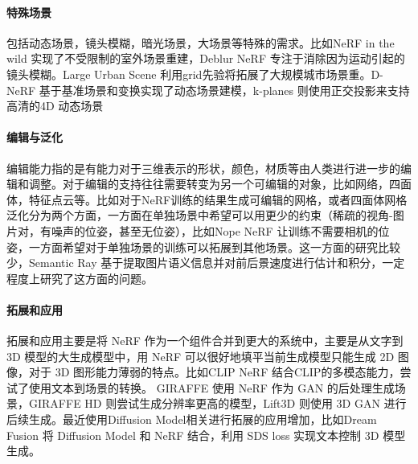 \paragraph{特殊场景}

包括动态场景，镜头模糊，暗光场景，大场景等特殊的需求。比如NeRF in the wild\cite{martin-bruallaNeRFWildNeural2021} 实现了不受限制的室外场景重建，Deblur NeRF \cite{leeDPNeRFDeblurredNeural2023} 专注于消除因为运动引起的镜头模糊。Large Urban Scene \cite{xuGridguidedNeuralRadiance2023} 利用grid先验将拓展了大规模城市场景重。D-NeRF \cite{pumarolaDNeRFNeuralRadiance2021} 基于基准场景和变换实现了动态场景建模，k-planes\cite{KPlanesExplicitRadiance2023} 则使用正交投影来支持高清的4D 动态场景

\paragraph{编辑与泛化}

编辑能力指的是有能力对于三维表示的形状，颜色，材质等由人类进行进一步的编辑和调整。对于编辑的支持往往需要转变为另一个可编辑的对象，比如网络，四面体，特征点云等。比如对于NeRF训练的结果生成可编辑的网格，或者四面体网格\cite{kulhanekTetraNeRFRepresentingNeural2023}
泛化分为两个方面，一方面在单独场景中希望可以用更少的约束（稀疏的视角-图片对，有噪声的位姿，甚至无位姿），比如Nope NeRF \cite{bianNoPeNeRFOptimisingNeural2023} 让训练不需要相机的位姿，一方面希望对于单独场景的训练可以拓展到其他场景。这一方面的研究比较少，Semantic Ray \cite{liuSemanticRayLearning2023} 基于提取图片语义信息并对前后景速度进行估计和积分，一定程度上研究了这方面的问题。

\paragraph{拓展和应用}

拓展和应用主要是将 NeRF 作为一个组件合并到更大的系统中，主要是从文字到 3D 模型的大生成模型中，用 NeRF 可以很好地填平当前生成模型只能生成 2D 图像，对于 3D 图形能力薄弱的特点。比如CLIP NeRF \cite{wangCLIPNeRFTextandImageDriven2022} 结合CLIP的多模态能力，尝试了使用文本到场景的转换。
GIRAFFE \cite{niemeyerGIRAFFERepresentingScenes2021} 使用 NeRF 作为 GAN 的后处理生成场景，GIRAFFE HD \cite{xueGIRAFFEHDHighResolution2022} 则尝试生成分辨率更高的模型，Lift3D \cite{liLift3DSynthesize3D2023} 则使用 3D GAN 进行后续生成。最近使用Diffusion Model相关进行拓展的应用增加，比如Dream Fusion \cite{pooleDreamFusionTextto3DUsing2022} 将 Diffusion Model 和 NeRF 结合，利用 SDS loss 实现文本控制 3D 模型生成。

